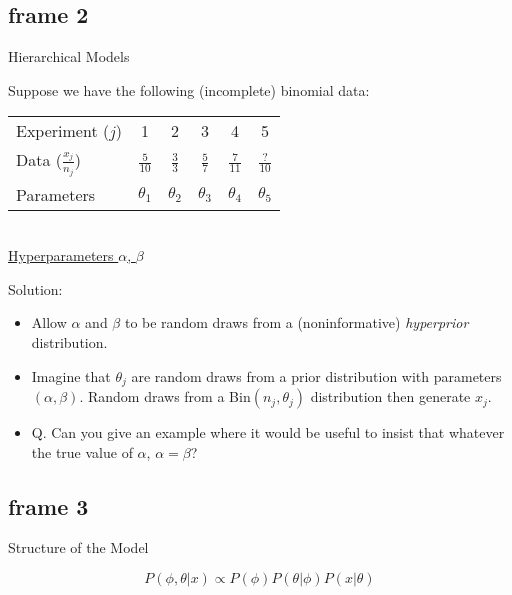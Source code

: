 \documentclass[xcolor=x11names,compress]{beamer}
\renewcommand{\(}{\begin{columns}}
\renewcommand{\)}{\end{columns}}
\newcommand{\<}[1]{\begin{column}{#1}}
\renewcommand{\>}{\end{column}}
\begin{document}
\subsection{frame 2}
\begin{frame}{Hierarchical Models}
\begin{center}
Suppose we have the following (incomplete) binomial data: \\
\begin{tabular}{l|c|c|c|c|c} \hline
Experiment ($j$) & 1 & 2 & 3 & 4 & 5 \\
Data ($\frac{x_j}{n_j}$) & $\frac{5}{10}$ & $\frac{3}{3}$ & $\frac{5}{7}$ & $\frac{7}{11}$ & $\frac{?}{10}$ \\ \hline
Parameters & $\theta_1$ & $\theta_2$ & $\theta_3$ & $\theta_4$ & $\theta_5$ \\ \hline
\end{tabular}
\\
\underline{Hyperparameters $\alpha$, $\beta$}
\end{center}
Solution:
\begin{itemize}
\pause \item Allow $\alpha$ and $\beta$ to be random draws from a (noninformative) \textit{hyperprior} distribution.
\pause \item Imagine that $\theta_j$ are random draws from a prior distribution with parameters $(\alpha, \beta)$. Random draws from a Bin$(n_j,\theta_j)$ distribution then generate $x_j$.
\pause \item Q. Can you give an example where it would be useful to insist that whatever the true value of $\alpha$, $\alpha=\beta$?
\end{itemize}
\end{frame}
\subsection{frame 3}
\begin{frame}{Structure of the Model}

\begin{figure}%
    \centering
    \qquad
	\qquad
    \label{fig:example}%

\end{figure}

$$P(\phi, \theta | x) \propto P(\phi)P(\theta | \phi)P(x | \theta)$$

\end{frame}
\end{document}
